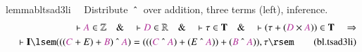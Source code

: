 \begin{restatable}{lemma}{bltsad3li}~~ Distribute $~\string^~$ over addition,
three terms (left), inference.
\begin{align}
\vdash \mc{A} \in \mathbb{Z}\quad\&\quad \vdash \mc{D} \in
    \mathbb{R}\quad\&\quad \vdash \tau \in \mathbf{T}\quad\&\quad \vdash ( \tau
    + ( \mc{D} \times \mc{A} ) ) \in \mathbf{T}\quad\Rightarrow \notag \\ %
     \quad \vdash
    \mathbf{I} \lsem ( ( ( \mc{C} + E ) + \mc{B} ) ~\string^~ \mc{A} ) = ( ( (
    \mc{C} ~\string^~ \mc{A} ) + ( E ~\string^~ \mc{A} ) ) + ( \mc{B}
    ~\string^~ \mc{A} ) ) , \tau \rsem\label{eq:bl.tsad3li}\tag{bl.tsad3li}
\end{align}
\end{restatable}

